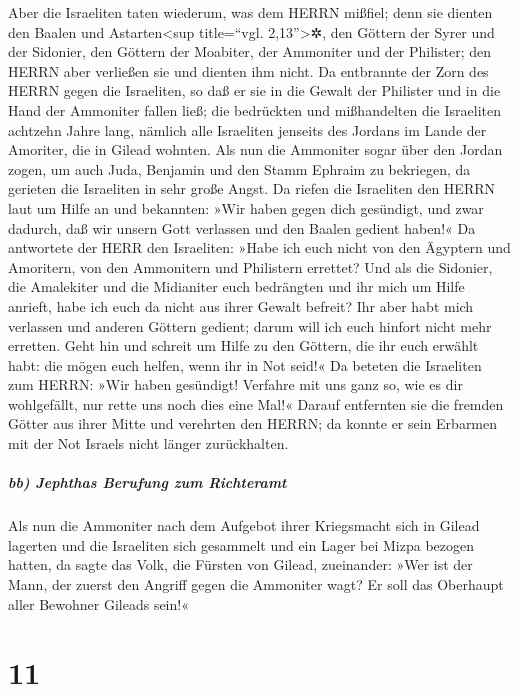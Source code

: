Aber die Israeliten taten wiederum, was dem HERRN mißfiel;
denn sie dienten den Baalen und Astarten\textless sup title=``vgl.
2,13''\textgreater✲, den Göttern der Syrer und der Sidonier, den Göttern
der Moabiter, der Ammoniter und der Philister; den HERRN aber verließen
sie und dienten ihm nicht. Da entbrannte der Zorn des
HERRN gegen die Israeliten, so daß er sie in die Gewalt der Philister
und in die Hand der Ammoniter fallen ließ; die bedrückten
und mißhandelten die Israeliten achtzehn Jahre lang, nämlich alle
Israeliten jenseits des Jordans im Lande der Amoriter, die in Gilead
wohnten. Als nun die Ammoniter sogar über den Jordan
zogen, um auch Juda, Benjamin und den Stamm Ephraim zu bekriegen, da
gerieten die Israeliten in sehr große Angst. Da riefen
die Israeliten den HERRN laut um Hilfe an und bekannten: »Wir haben
gegen dich gesündigt, und zwar dadurch, daß wir unsern Gott verlassen
und den Baalen gedient haben!« Da antwortete der HERR den
Israeliten: »Habe ich euch nicht von den Ägyptern und Amoritern, von den
Ammonitern und Philistern errettet? Und als die Sidonier,
die Amalekiter und die Midianiter euch bedrängten und ihr mich um Hilfe
anrieft, habe ich euch da nicht aus ihrer Gewalt befreit?
Ihr aber habt mich verlassen und anderen Göttern gedient;
darum will ich euch hinfort nicht mehr erretten. Geht hin
und schreit um Hilfe zu den Göttern, die ihr euch erwählt habt: die
mögen euch helfen, wenn ihr in Not seid!« Da beteten die
Israeliten zum HERRN: »Wir haben gesündigt! Verfahre mit uns ganz so,
wie es dir wohlgefällt, nur rette uns noch dies eine Mal!«
Darauf entfernten sie die fremden Götter aus ihrer Mitte
und verehrten den HERRN; da konnte er sein Erbarmen mit der Not Israels
nicht länger zurückhalten.

\hypertarget{bb-jephthas-berufung-zum-richteramt}{%
\subparagraph{bb) Jephthas Berufung zum
Richteramt}\label{bb-jephthas-berufung-zum-richteramt}}

Als nun die Ammoniter nach dem Aufgebot ihrer Kriegsmacht
sich in Gilead lagerten und die Israeliten sich gesammelt und ein Lager
bei Mizpa bezogen hatten, da sagte das Volk, die Fürsten
von Gilead, zueinander: »Wer ist der Mann, der zuerst den Angriff gegen
die Ammoniter wagt? Er soll das Oberhaupt aller Bewohner Gileads sein!«

\hypertarget{section-10}{%
\section{11}\label{section-10}}

